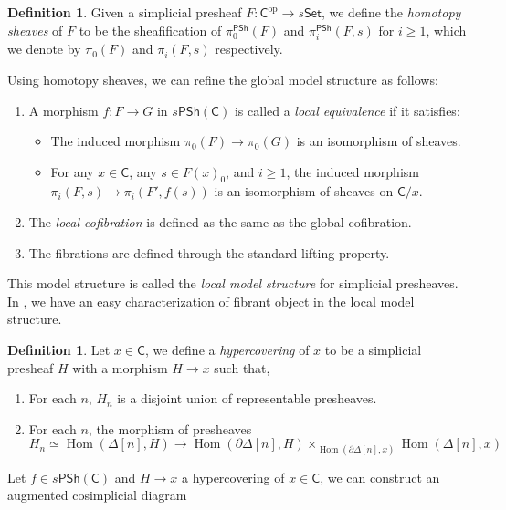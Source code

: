\documentclass[12pt]{amsart}
\theoremstyle{definition}
\newtheorem{defn}[thm]{Definition}
\theoremstyle{remark}
\numberwithin{equation}{section}
\newcommand{\del}{\partial}
\renewcommand{\del}{\partial}
\newcommand{\CC}{{\mathsf C}}
\newcommand{\1}{{\mathbb{1}}}
\newcommand{\op}{\operatorname{op}}
\newcommand{\set}{\mathsf{Set}}
\newcommand{\psh}{\mathsf{PSh}}
\newcommand{\Hom}{\operatorname{Hom}}
\begin{document}
\begin{defn}
    Given a simplicial presheaf $F:\CC^{\op} \to s\set$, we define the {\it homotopy sheaves} of $F$ to be the sheafification of $\pi^{\psh}_0(F)$ and $\pi^{\psh}_i(F, s)$ for $i \ge 1$, which we denote by $\pi^{}_0(F)$ and $\pi^{}_i(F, s)$ respectively.
\end{defn}
Using homotopy sheaves, we can refine the global model structure as follows:
\begin{enumerate}
    \item A morphism $f:F \to G$ in $s\psh(\CC)$ is called a {\it local equivalence}{} if it satisfies:
    \begin{itemize}
        \item The induced morphism $\pi_0(F)\to \pi_0(G)$ is an isomorphism of sheaves.
        \item For any $x\in \CC$, any $s\in F(x)_0$, and $i\ge 1$, the induced morphism $\pi_i(F,s)\to \pi_i(F', f(s))$ is an isomorphism of sheaves on $\CC/x$.
    \end{itemize}
    \item The {\it local cofibration} is defined as the same as the global cofibration.
    \item The fibrations are defined through the standard lifting property.
\end{enumerate}
This model structure is called the {\it local model structure} for simplicial presheaves. In \cite{DHI04}, we have an easy characterization of fibrant object in the local model structure. 
\begin{defn}
    Let $x\in \CC$, we define a {\it hypercovering} of $x$ to be a simplicial presheaf $H$ with a morphism $H\to x$ such that,
    \begin{enumerate}
        \item For each $n$, $H_n$ is a disjoint union of representable presheaves.
        \item For each $n$, the morphism of presheaves
        \begin{equation*}
            H_n\simeq \Hom(\Delta[n], H)\to \Hom(\del \Delta[n], H) \times_{\Hom(\del \Delta[n], x)} \Hom( \Delta[n], x) 
        \end{equation*}
    \end{enumerate}
    
\end{defn} 
Let $f\in s\psh(\CC)$ and $H\to x$ a hypercovering of $x\in \CC$, we can construct an augmented cosimplicial diagram
\end{document}
